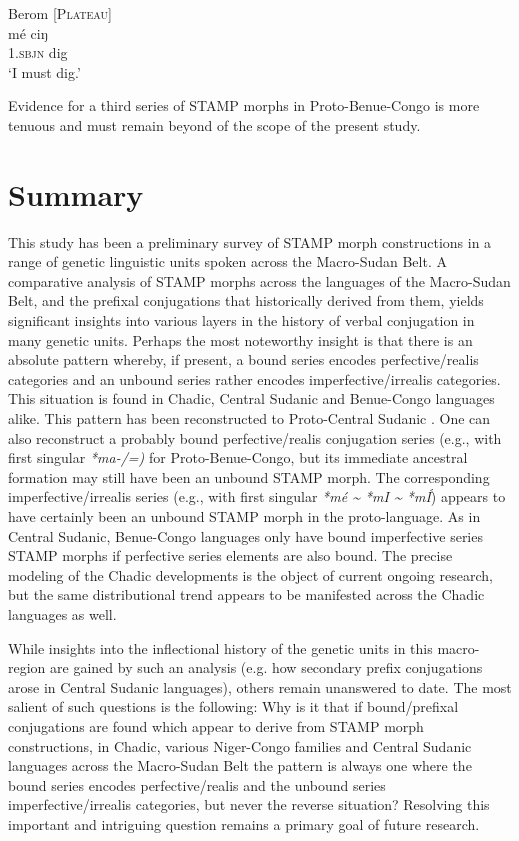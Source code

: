 \documentclass[output=paper]{langsci/langscibook}
\begin{document}
\ea\label{ex:anderson:77}
Berom  \citep[300]{Bouquiaux1970}        \textsc{[Plateau]}\\
\gll mé    ciŋ\\
1.\textsc{sbjn}  dig\\
\glt `I must dig.'
\z

Evidence for a third series of STAMP morphs in Proto-Benue-Congo is more tenuous and must remain beyond of the scope of the present study.

\section{Summary}\label{sec:Anderson:10}

This study has been a preliminary survey of STAMP morph constructions in a range of genetic linguistic units spoken across the Macro-Sudan Belt. A comparative analysis of STAMP morphs across the languages of the Macro-Sudan Belt, and the prefixal conjugations that historically derived from them, yields significant insights into various layers in the history of verbal conjugation in many genetic units. Perhaps the most noteworthy insight is that there is an absolute pattern whereby, if present, a bound series encodes perfective/realis categories and an unbound series rather encodes imperfective/irrealis categories. This situation is found in Chadic, Central Sudanic and Benue-Congo languages alike. This pattern has been reconstructed to Proto-Central Sudanic \citep{Anderson2015}. One can also reconstruct a probably bound perfective/realis conjugation series (e.g., with first singular \textit{*ma-/=)} for Proto-Benue-Congo, but its immediate ancestral formation may still have been an unbound STAMP morph. The corresponding imperfective/irrealis series (e.g., with first singular \textit{*mé {\textasciitilde} *mI {\textasciitilde} *mÍ}) appears to have certainly been an unbound STAMP morph in the proto-language. As in Central Sudanic, Benue-Congo languages only have bound imperfective series STAMP morphs if perfective series elements are also bound. The precise modeling of the Chadic developments is the object of current ongoing research, but the same distributional trend appears to be manifested across the Chadic languages as well. 

While insights into the inflectional history of the genetic units in this macro-region are gained by such an analysis (e.g. how secondary prefix conjugations arose in Central Sudanic languages), others remain unanswered to date. The most salient of such questions is the following: Why is it that if bound/prefixal conjugations are found which appear to derive from STAMP morph constructions, in Chadic, various Niger-Congo families and Central Sudanic languages across the Macro-Sudan Belt the pattern is always one where the bound series encodes perfective/realis and the unbound series imperfective/irrealis categories, but never the reverse situation? Resolving this important and intriguing question remains a primary goal of future research. 
\end{document}
